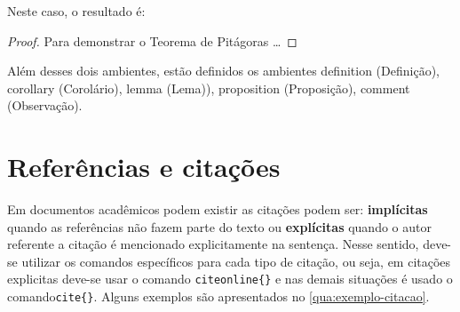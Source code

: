 Neste caso, o resultado é:
\begin{proof}
Para demonstrar o Teorema de Pitágoras \dots
\end{proof}

Além desses dois ambientes, estão definidos os ambientes \textsf{definition} (Definição), \textsf{corollary} (Corolário), \textsf{lemma} (Lema)), \textsf{proposition} (Proposição), \textsf{comment} (Observação).

\section{Referências e citações}

Em documentos acadêmicos podem existir as citações podem ser: \textbf{implícitas} quando as referências não fazem parte do texto ou \textbf{explícitas} quando o autor referente a citação é mencionado explicitamente na sentença. Nesse sentido, deve-se utilizar os comandos específicos para cada tipo de citação, ou seja, em citações explicitas deve-se usar o comando \verb|citeonline{}| e nas demais situações é usado o comando\verb|cite{}|. Alguns exemplos são apresentados no \autoref{qua:exemplo-citacao}.

